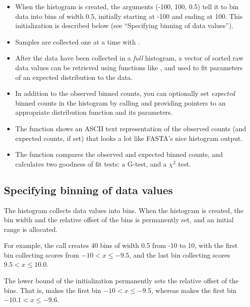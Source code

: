 \begin{itemize}
\item When the histogram is created, the arguments \ccode(-100, 100, 0.5)
      tell it to bin data into bins of width 0.5, initially
      starting at -100 and ending at 100. This initialization
      is described below (see ``Specifying binning of data values'').

\item Samples are collected one at a time with
  .

\item After the data have been collected in a \emph{full} histogram, a
   vector of sorted raw data values can be retrieved using functions
   like , and used to fit parameters
   of an expected distribution to the data.

\item In addition to the observed binned counts, you can optionally
   set \emph{expected} binned counts in the histogram by calling
    and providing pointers
   to an appropriate distribution function and its parameters.

\item The  function shows an ASCII text
   representation of the observed counts (and expected counts, if set)
   that looks a lot like FASTA's nice histogram output.

\item The  function compares the
   observed and expected binned counts, and calculates two goodness of
   fit tests: a G-test, and a $\chi^2$ test.
\end{itemize}


\subsection{Specifying binning of data values}

The histogram collects data values into bins. When the histogram is
created, the bin width and the relative offset of the bins is
permanently set, and an initial range is allocated. 

For example, the call 
creates 40 bins of width 0.5 from -10 to 10, with the first bin
collecting scores from $-10 < x \leq -9.5$, and the last bin
collecting scores $9.5 < x \leq 10.0$.

The lower bound of the initialization permanently sets the relative
offset of the bins. That is,  makes the first bin $-10 < x \leq -9.5$, whereas
 makes the first bin
$-10.1 < x \leq -9.6$.

